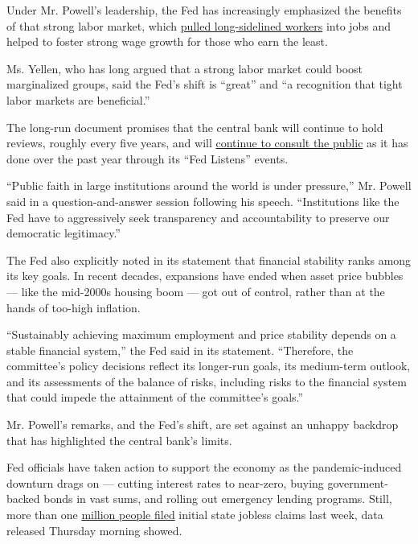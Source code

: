 Under Mr. Powell's leadership, the Fed has increasingly emphasized the
benefits of that strong labor market, which
\href{https://www.nytimes3xbfgragh.onion/2020/02/07/business/black-unemployment-wages.html}{pulled
long-sidelined workers} into jobs and helped to foster strong wage
growth for those who earn the least.

Ms. Yellen, who has long argued that a strong labor market could boost
marginalized groups, said the Fed's shift is ``great'' and ``a
recognition that tight labor markets are beneficial.''

The long-run document promises that the central bank will continue to
hold reviews, roughly every five years, and will
\href{https://www.nytimes3xbfgragh.onion/2020/08/26/business/economy/fed-meeting-powell.html}{continue
to consult the public} as it has done over the past year through its
``Fed Listens'' events.

``Public faith in large institutions around the world is under
pressure,'' Mr. Powell said in a question-and-answer session following
his speech. ``Institutions like the Fed have to aggressively seek
transparency and accountability to preserve our democratic legitimacy.''

The Fed also explicitly noted in its statement that financial stability
ranks among its key goals. In recent decades, expansions have ended when
asset price bubbles --- like the mid-2000s housing boom --- got out of
control, rather than at the hands of too-high inflation.

``Sustainably achieving maximum employment and price stability depends
on a stable financial system,'' the Fed said in its statement.
``Therefore, the committee's policy decisions reflect its longer-run
goals, its medium-term outlook, and its assessments of the balance of
risks, including risks to the financial system that could impede the
attainment of the committee's goals.''

Mr. Powell's remarks, and the Fed's shift, are set against an unhappy
backdrop that has highlighted the central bank's limits.

Fed officials have taken action to support the economy as the
pandemic-induced downturn drags on --- cutting interest rates to
near-zero, buying government-backed bonds in vast sums, and rolling out
emergency lending programs. Still, more than one
\href{https://slack-redir.net/link?url=https\%3A\%2F\%2Fwww.nytimes3xbfgragh.onion\%2Flive\%2F2020\%2F08\%2F27\%2Fbusiness\%2Fstock-market-today-coronavirus}{million
people filed} initial state jobless claims last week, data released
Thursday morning showed.

